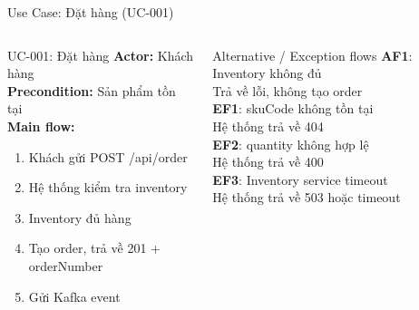 \documentclass[aspectratio=169,12pt]{beamer}
\begin{document}
\begin{frame}[shrink=8]{Use Case: Đặt hàng (UC-001)}
  \begin{columns}[T,totalwidth=\textwidth]
    \small
    \begin{block}{UC-001: Đặt hàng}
      \textbf{Actor:} Khách hàng\\
      \textbf{Precondition:} Sản phẩm tồn tại\\[0.3em]
      \textbf{Main flow:}
      \begin{enumerate}
        \item Khách gửi POST /api/order
        \item Hệ thống kiểm tra inventory
        \item Inventory đủ hàng
        \item Tạo order, trả về 201 + orderNumber
        \item Gửi Kafka event
      \end{enumerate}
    \end{block}

    \small
    \begin{alertblock}{Alternative / Exception flows}
      \textbf{AF1}: Inventory không đủ\\
      \quad Trả về lỗi, không tạo order\\[0.3em]
      \textbf{EF1}: skuCode không tồn tại\\
      \quad Hệ thống trả về 404\\[0.3em]
      \textbf{EF2}: quantity không hợp lệ\\
      \quad Hệ thống trả về 400\\[0.3em]
      \textbf{EF3}: Inventory service timeout\\
      \quad Hệ thống trả về 503 hoặc timeout
    \end{alertblock}
  \end{columns}
\end{frame}
\end{document}
